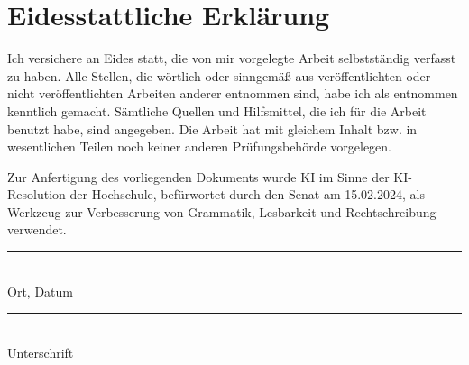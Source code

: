 
\chapter*{Eidesstattliche Erklärung}

Ich versichere an Eides statt, die von mir vorgelegte Arbeit selbstständig verfasst zu haben.
Alle Stellen, die wörtlich oder sinngemäß aus veröffentlichten oder nicht veröffentlichten Arbeiten anderer entnommen sind,
habe ich als entnommen kenntlich gemacht.
Sämtliche Quellen und Hilfsmittel, die ich für die Arbeit benutzt habe, sind angegeben.
Die Arbeit hat mit gleichem Inhalt bzw. in wesentlichen Teilen noch keiner anderen Prüfungsbehörde vorgelegen.

Zur Anfertigung des vorliegenden Dokuments wurde KI im Sinne der KI-Resolution der Hochschule, befürwortet durch den Senat am 15.02.2024,
als Werkzeug zur Verbesserung von Grammatik, Lesbarkeit und Rechtschreibung verwendet.

\vspace{2cm}

\noindent
\begin{minipage}[t]{0.45\textwidth}
\raggedright
\rule{\textwidth}{0.4pt}\\
Ort, Datum
\end{minipage}
\hfill
\begin{minipage}[t]{0.45\textwidth}
\raggedright
\rule{\textwidth}{0.4pt}\\
Unterschrift
\end{minipage}

\clearpage
